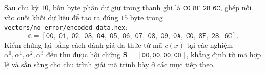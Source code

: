 \documentclass[12pt,a4paper]{report}
\begin{document}
Sau chu kỳ $10$, bốn byte phần dư giữ trong thanh ghi là $\texttt{C0 8F 28 6C}$, ghép nối vào cuối khối dữ liệu để tạo ra đúng $15$ byte trong \texttt{vectors/no\_error/encoded\_data.hex}:
\[
    \mathbf{c} = [\texttt{00},\; \texttt{01},\; \texttt{02},\; \texttt{03},\; \texttt{04},\; \texttt{05},\; \texttt{06},\; \texttt{07},\; \texttt{08},\; \texttt{09},\; \texttt{0A},\; \texttt{C0},\; \texttt{8F},\; \texttt{28},\; \texttt{6C}].
\]
Kiểm chứng lại bằng cách đánh giá đa thức từ mã $c(x)$ tại các nghiệm $\alpha^0, \alpha^1, \alpha^2, \alpha^3$ đều thu được hội chứng $\mathbf{S} = [\texttt{00}, \texttt{00}, \texttt{00}, \texttt{00}]$, khẳng định từ mã hợp lệ và sẵn sàng cho chu trình giải mã trình bày ở các mục tiếp theo.
\end{document}

